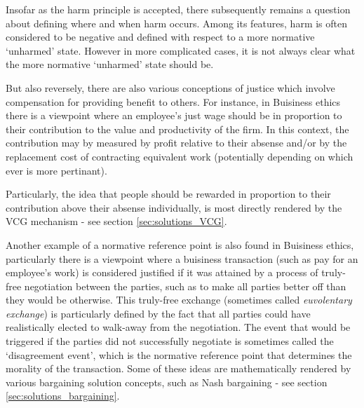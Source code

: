 Insofar as the harm principle is accepted, there subsequently remains a question about defining where and when harm occurs.
Among its features, harm is often considered to be negative and defined with respect to a more normative `unharmed' state.
However in more complicated cases, it is not always clear what the more normative `unharmed' state should be.%

But also reversely, there are also various conceptions of justice which involve compensation for providing benefit to others.
For instance, in Buisiness ethics there is a viewpoint where an employee's just wage should be in proportion to their contribution to the value and productivity of the firm.\cite{sternberg2000just}
In this context, the contribution may by measured by profit relative to their absense and/or by the replacement cost of contracting equivalent work (potentially depending on which ever is more pertinant).

Particularly, the idea that people should be rewarded in proportion to their contribution above their absense individually, is most directly rendered by the VCG mechanism - see section \ref{sec:solutions_VCG}.


Another example of a normative reference point is also found in Buisiness ethics, particularly there is a viewpoint where a buisiness transaction (such as pay for an employee's work) is considered justified if it was attained by a process of truly-free negotiation between the parties, such as to make all parties better off than they would be otherwise.\cite{ExecutiveCompensationUnjustorJustRight} 
This truly-free exchange (sometimes called \textit{euvolentary exchange}) is particularly defined by the fact that all parties could have realistically elected to walk-away from the negotiation.\cite{Guzman2019}
The event that would be triggered if the parties did not successfully negotiate is sometimes called the `disagreement event', which is the normative reference point that determines the morality of the transaction.
Some of these ideas are mathematically rendered by various bargaining solution concepts, such as Nash bargaining - see section \ref{sec:solutions_bargaining}.

